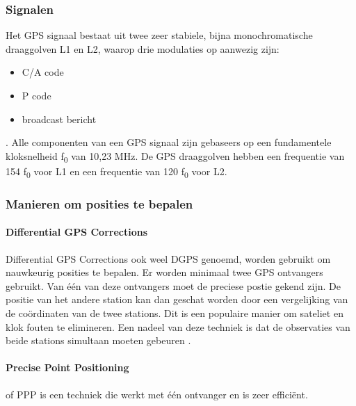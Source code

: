 \subsubsection{Signalen}
Het GPS signaal bestaat uit twee zeer stabiele, bijna monochromatische draaggolven L1 en L2, waarop drie modulaties op aanwezig zijn:
\begin{itemize}
	\item C/A code
	\item P code
	\item broadcast bericht
\end{itemize}. 
Alle componenten van een GPS signaal zijn gebaseers op een fundamentele kloksnelheid f\textsubscript{0} van 10,23 MHz. De GPS draaggolven hebben een frequentie van 154 f\textsubscript{0} voor L1 en een frequentie van 120 f\textsubscript{0} voor L2\cite{LBibGPS2}.

\subsubsection{Manieren om posities te bepalen}
\paragraph{Differential GPS Corrections}
Differential GPS Corrections ook weel DGPS genoemd, worden gebruikt om nauwkeurig posities  te bepalen. Er worden minimaal twee GPS ontvangers gebruikt. Van \'e\'en van deze ontvangers moet de preciese postie gekend zijn. De positie van het andere station kan dan geschat worden door een vergelijking van de co\"ordinaten van de twee stations. Dit is een populaire manier om sateliet en klok fouten te elimineren. Een nadeel van deze techniek is dat de observaties van beide stations simultaan moeten gebeuren \cite{LBibGNSS2}. 

\paragraph{Precise Point Positioning}
of PPP is een techniek die werkt met \'e\'en ontvanger en is zeer effici\"ent. \cite{LBibGNSS4}

